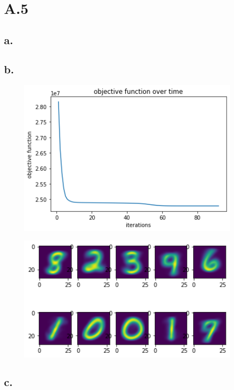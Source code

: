 \documentclass{article}
\newcommand{\1}{\mathbf{1}}
\begin{document}
\section*{A.5}
{\Large 

\subsection*{a.}

\subsection*{b.}

\begin{figure}[!hb]
  \centering
  \includegraphics[width=110mm]{../hw4-code/results/a5_b.png}
\end{figure}

\begin{figure}[!ht]
  \centering
  \includegraphics[width=110mm]{../hw4-code/results/a5_bcenter.png}
\end{figure}

\newpage

\subsection*{c.}

}
\end{document}
